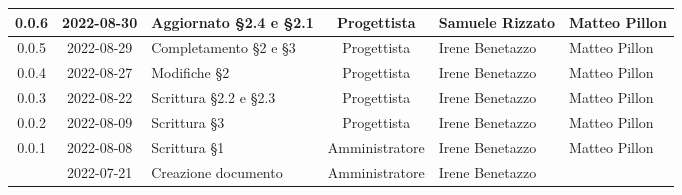 \begin{center}
\begin{longtable}{ |c|c|p{8em}|c|m{5em}|m{6em}| }
	\hline
	0.0.6 & 2022-08-30 & Aggiornato §2.4 e §2.1 & Progettista & Samuele \newline Rizzato & Matteo Pillon \\ 
	\hline
	0.0.5 & 2022-08-29 & Completamento §2 e §3 & Progettista & Irene \newline Benetazzo & Matteo \newline Pillon\\ 
	\hline
	0.0.4 & 2022-08-27 & Modifiche §2 & Progettista & Irene \newline Benetazzo & Matteo \newline Pillon \\ 
	\hline
	0.0.3 & 2022-08-22 & Scrittura §2.2 e §2.3 & Progettista & Irene \newline Benetazzo & Matteo Pillon\\ 
	\hline
    0.0.2 & 2022-08-09 & Scrittura §3 & Progettista & Irene \newline Benetazzo & Matteo \newline Pillon \\ 
	\hline
	0.0.1 & 2022-08-08 & Scrittura §1 & Amministratore & Irene \newline Benetazzo & Matteo Pillon\\ 
	\hline
	& 2022-07-21 & Creazione documento & Amministratore & Irene \newline Benetazzo & \\ 
	\hline
	\end{longtable}
	\end{center}
	\newpage
